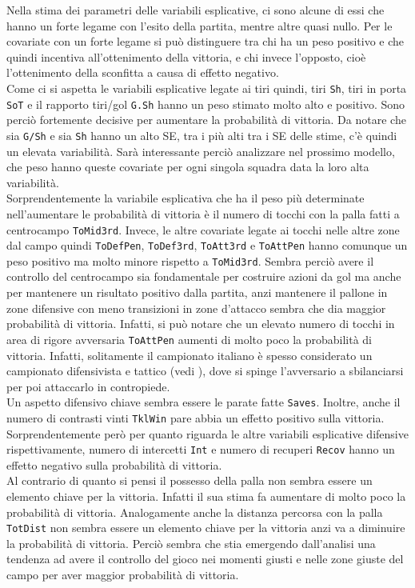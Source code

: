 Nella stima dei parametri delle variabili esplicative, ci sono alcune di essi che hanno un forte legame con l'esito della partita, mentre altre quasi nullo. Per le covariate con un forte legame si può distinguere tra chi ha un peso positivo e che quindi incentiva all'ottenimento della vittoria, e chi invece l'opposto, cioè l'ottenimento della sconfitta a causa di effetto negativo.\\
Come ci si aspetta le variabili esplicative legate ai tiri quindi, tiri \texttt{Sh}, tiri in porta \texttt{SoT} e il rapporto tiri/gol \texttt{G.Sh} hanno un peso stimato molto alto e positivo. Sono perciò fortemente decisive per aumentare la probabilità di vittoria. Da notare che sia \texttt{G/Sh} e sia \texttt{Sh} hanno un alto SE, tra i più alti tra i SE delle stime, c'è quindi un elevata variabilità. Sarà interessante perciò analizzare nel prossimo modello, che peso hanno queste covariate per ogni singola squadra data la loro alta variabilità.\\
Sorprendentemente la variabile esplicativa che ha il peso più determinate nell'aumentare le probabilità di vittoria è il numero di tocchi con la palla fatti a centrocampo \texttt{ToMid3rd}. Invece, le altre covariate legate ai tocchi nelle altre zone dal campo quindi \texttt{ToDefPen}, \texttt{ToDef3rd}, \texttt{ToAtt3rd} e \texttt{ToAttPen} hanno comunque un peso positivo ma molto minore rispetto a \texttt{ToMid3rd}. Sembra perciò avere il controllo del centrocampo sia fondamentale per costruire azioni da gol ma anche per mantenere un risultato positivo dalla partita, anzi mantenere il pallone in zone difensive con meno transizioni in zone d'attacco sembra che dia maggior probabilità di vittoria. Infatti, si può notare che un elevato numero di tocchi in area di rigore avversaria \texttt{ToAttPen} aumenti di molto poco la probabilità di vittoria. Infatti, solitamente il campionato italiano è spesso considerato un campionato difensivista e tattico (vedi \textit{\cite{site:speculazione}}), dove si spinge l'avversario a sbilanciarsi per poi attaccarlo in contropiede.\\
Un aspetto difensivo chiave sembra essere le parate fatte \texttt{Saves}. Inoltre, anche il numero di contrasti vinti \texttt{TklWin} pare abbia un effetto positivo sulla vittoria. Sorprendentemente però per quanto riguarda le altre variabili esplicative difensive rispettivamente, numero di intercetti \texttt{Int} e numero di recuperi \texttt{Recov} hanno un effetto negativo sulla probabilità di vittoria. \\
Al contrario di quanto si pensi il possesso della palla non sembra essere un elemento chiave per la vittoria. Infatti il sua stima fa aumentare di molto poco la probabilità di vittoria. Analogamente anche la distanza percorsa con la palla \texttt{TotDist} non sembra essere un elemento chiave per la vittoria anzi va a diminuire la probabilità di vittoria. Perciò sembra che stia emergendo dall'analisi una tendenza ad avere il controllo del gioco nei momenti giusti e nelle zone giuste del campo per aver maggior probabilità di vittoria.\\
